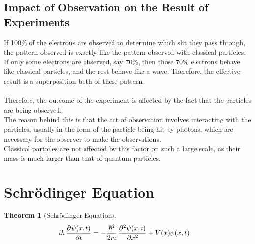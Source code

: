 \documentclass[titlepage, fleqn, a4paper, 12pt, twoside]{article}
\theoremstyle{definition}
\theoremstyle{theorem}
\newtheorem{theorem}{Theorem}
\let\Oldsection\section
\renewcommand{\section}{\FloatBarrier\Oldsection}
\let\Oldsubsection\subsection
\renewcommand{\subsection}{\FloatBarrier\Oldsubsection}
\begin{document}
\subsection{Impact of Observation on the Result of Experiments}

If 100\% of the electrons are observed to determine which slit they pass through, the pattern observed is exactly like the pattern observed with classical particles.\\
If only some electrons are observed, say 70\%, then those 70\% electrons behave like classical particles, and the rest behave like a wave.
Therefore, the effective result is a superposition both of these pattern.\\
~\\
Therefore, the outcome of the experiment is affected by the fact that the particles are being observed.\\
The reason behind this is that the act of observation involves interacting with the particles, usually in the form of the particle being hit by photons, which are necessary for the observer to make the observations.\\
Classical particles are not affected by this factor on such a large scale, as their mass is much larger than that of quantum particles.

\section{Schrödinger Equation}

\begin{theorem}[Schrödinger Equation]
	\begin{align*}
		i \hbar \dpd{\psi(x,t)}{t} & = -\frac{\hbar^2}{2 m} \dpd[2]{\psi(x,t)}{x} + V(x) \psi(x,t)
	\end{align*}
	\label{Schrodinger_Equation}
\end{theorem}
\end{document}
